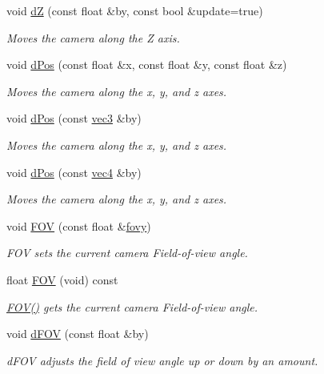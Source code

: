 \begin{DoxyCompactItemize}
void \hyperlink{class_camera_ab94ed9b3c7e12f484d6bfa5f827b59ff}{d\-Z} (const float \&by, const bool \&update=true)
\begin{DoxyCompactList}\small\item\em Moves the camera along the Z axis. \end{DoxyCompactList}\item 
void \hyperlink{class_camera_a2ac5f89b4f9f012dead66980925143c0}{d\-Pos} (const float \&x, const float \&y, const float \&z)
\begin{DoxyCompactList}\small\item\em Moves the camera along the x, y, and z axes. \end{DoxyCompactList}\item 
void \hyperlink{class_camera_a928de59670f0b31264307a8a0888b99d}{d\-Pos} (const \hyperlink{struct_angel_1_1vec3}{vec3} \&by)
\begin{DoxyCompactList}\small\item\em Moves the camera along the x, y, and z axes. \end{DoxyCompactList}\item 
void \hyperlink{class_camera_a4ec2e3d2a66826aedb1ac1eee7da0b96}{d\-Pos} (const \hyperlink{struct_angel_1_1vec4}{vec4} \&by)
\begin{DoxyCompactList}\small\item\em Moves the camera along the x, y, and z axes. \end{DoxyCompactList}\item 
void \hyperlink{class_camera_ac325bf616014d2e6023b84b6224630ac}{F\-O\-V} (const float \&\hyperlink{class_camera_acc8b97facc57059530efad534c2f8314}{fovy})
\begin{DoxyCompactList}\small\item\em F\-O\-V sets the current camera Field-\/of-\/view angle. \end{DoxyCompactList}\item 
float \hyperlink{class_camera_a8817ea073431268d8c0e522cdc30026c}{F\-O\-V} (void) const 
\begin{DoxyCompactList}\small\item\em \hyperlink{class_camera_a8817ea073431268d8c0e522cdc30026c}{F\-O\-V()} gets the current camera Field-\/of-\/view angle. \end{DoxyCompactList}\item 
void \hyperlink{class_camera_a55355b3376d195b17adcc6a5b72ae07b}{d\-F\-O\-V} (const float \&by)
\begin{DoxyCompactList}\small\item\em d\-F\-O\-V adjusts the field of view angle up or down by an amount. \end{DoxyCompactList}\item 

\end{DoxyCompactItemize}
